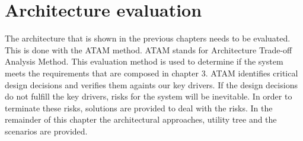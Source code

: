 \section{Architecture evaluation}
The architecture that is shown in the previous chapters needs to be evaluated. This is done with the ATAM method. ATAM stands for Architecture Trade-off Analysis Method. This evaluation method is used to determine if the system meets the requirements that are composed in chapter 3. ATAM identifies critical design decisions and verifies them againts our key drivers. If the design decisions do not fulfill the key drivers, risks for the system will be inevitable. In order to terminate these risks, solutions are provided to deal with the risks. In the remainder of this chapter the architectural approaches, utility tree and the scenarios are provided. 



